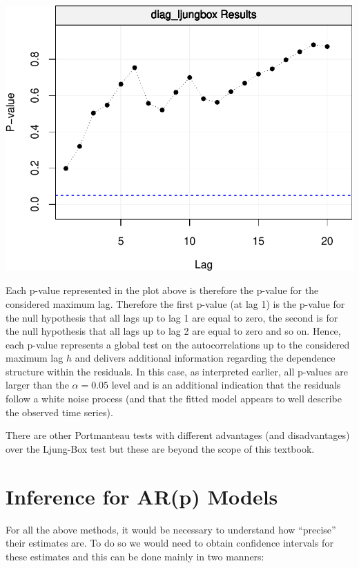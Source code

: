 \documentclass[]{book}
\theoremstyle{definition}
\theoremstyle{definition}
\theoremstyle{definition}
\theoremstyle{remark}
\begin{document}
\includegraphics{ts_files/figure-latex/unnamed-chunk-49-1.pdf}

Each p-value represented in the plot above is therefore the p-value for
the considered maximum lag. Therefore the first p-value (at lag 1) is
the p-value for the null hypothesis that all lags up to lag 1 are equal
to zero, the second is for the null hypothesis that all lags up to lag 2
are equal to zero and so on. Hence, each p-value represents a global
test on the autocorrelations up to the considered maximum lag \(h\) and
delivers additional information regarding the dependence structure
within the residuals. In this case, as interpreted earlier, all p-values
are larger than the \(\alpha = 0.05\) level and is an additional
indication that the residuals follow a white noise process (and that the
fitted model appears to well describe the observed time series).

There are other Portmanteau tests with different advantages (and
disadvantages) over the Ljung-Box test but these are beyond the scope of
this textbook.

\hypertarget{inference-for-arp-models}{%
\section{Inference for AR(p) Models}\label{inference-for-arp-models}}

For all the above methods, it would be necessary to understand how
``precise'' their estimates are. To do so we would need to obtain
confidence intervals for these estimates and this can be done mainly in
two manners:
\end{document}
